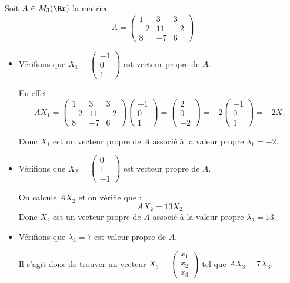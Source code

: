 \documentclass[11pt, class=report,crop=false]{standalone}
\begin{document}
 
\begin{exemple}
Soit $A \in M_3(\Rr)$ la matrice 
$$A = \begin{pmatrix}
1 & 3 & 3 \\
-2 & 11 & -2 \\
8 & -7 & 6
\end{pmatrix}$$
\begin{itemize}
  \item Vérifions que $X_1 = \begin{pmatrix}-1\\0\\1\end{pmatrix}$ 
  est vecteur propre de $A$.
  
  En effet
 $$A X_1 = \begin{pmatrix}
1 & 3 & 3 \\
-2 & 11 & -2 \\
8 & -7 & 6
\end{pmatrix} 
\begin{pmatrix}-1\\0\\1\end{pmatrix}
= \begin{pmatrix}2\\0\\-2\end{pmatrix}
= -2 \begin{pmatrix}-1\\0\\1\end{pmatrix}
= -2 X_1$$

Donc $X_1$ est un vecteur propre de $A$ associé à la valeur propre $\lambda_1 = -2$.

 \item Vérifions que $X_2 = \begin{pmatrix}0\\1\\-1\end{pmatrix}$ 
  est vecteur propre de $A$.
  
  On calcule $AX_2$ et on vérifie que :
  $$AX_2 = 13 X_2$$
  Donc $X_2$ est un vecteur propre de $A$ associé à la valeur propre $\lambda_2 = 13$.

  \item Vérifions que $\lambda_3 = 7$ est valeur propre de $A$.
  
  Il s'agit donc de trouver un vecteur $X_3 = \begin{pmatrix}x_1\\x_2\\x_3\end{pmatrix}$
  tel que $AX_3 = 7 X_3$.
  

\end{itemize}
\end{exemple}
\end{document}
